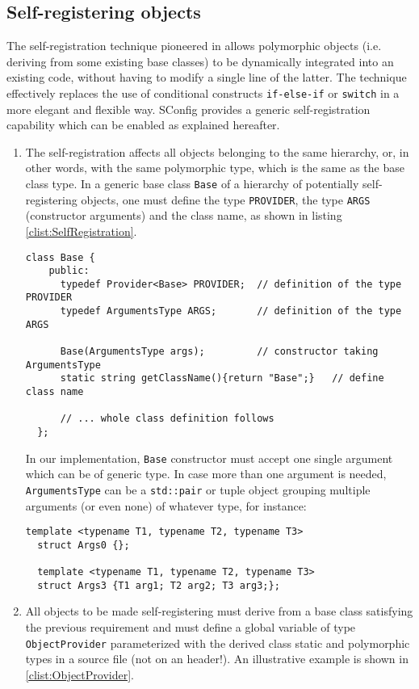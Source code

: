 \documentclass[11pt]{article}
\newcommand{\noi}{\noindent}
\begin{document}
\subsection{Self-registering objects}\label{ssec:self-registration}

The self-registration technique pioneered in \cite{Beveridge} allows 
polymorphic objects (i.e. deriving from some existing base classes) to be 
dynamically integrated into an existing code, without having to modify
a single line of the latter. The technique effectively replaces the
use of conditional constructs \texttt{if-else-if} or \texttt{switch}
in a more elegant and flexible way. SConfig provides a generic 
self-registration capability which can be enabled as explained hereafter.
\begin{enumerate}
\item
  The self-registration affects all objects belonging to the same 
  hierarchy, or, in other words, with the same polymorphic type, which
  is the same as the base class type. In a generic base class
  \texttt{Base} of a hierarchy of potentially self-registering objects, 
  one must define the type \texttt{PROVIDER}, the type \texttt{ARGS} 
  (constructor arguments) and the class name, as shown in listing \ref{clist:SelfRegistration}.  
\begin{lstlisting}[basicstyle={\small\sffamily},float=!htb,caption={How
    to enable Self-registration.}, label=clist:SelfRegistration]
  class Base {
    public:
      typedef Provider<Base> PROVIDER;  // definition of the type PROVIDER 
      typedef ArgumentsType ARGS;       // definition of the type ARGS      

      Base(ArgumentsType args);         // constructor taking ArgumentsType    
      static string getClassName(){return "Base";}   // define class name

      // ... whole class definition follows
  };
\end{lstlisting}
\noi
In our implementation, \texttt{Base} constructor must accept one single
argument which can be of generic type. In case more than one argument
is needed, \texttt{ArgumentsType} can be a \texttt{std::pair} or tuple
object grouping multiple arguments (or even none) of whatever type, 
for instance:
\begin{lstlisting}[basicstyle={\small\sffamily},float=!htb,caption={Examples
    of argument tuples.}, label=clist:ArgTuples]
  template <typename T1, typename T2, typename T3>
  struct Args0 {};

  template <typename T1, typename T2, typename T3>
  struct Args3 {T1 arg1; T2 arg2; T3 arg3;};
\end{lstlisting}
\noi
\item
  All objects to be made self-registering must derive from a
  base class satisfying the previous requirement and must define a
  global variable of type  \texttt{ObjectProvider} parameterized with 
  the derived class static and polymorphic types in a source file 
  (not on an header!). An illustrative example is shown in
  \ref{clist:ObjectProvider}.
  

\end{enumerate}
\end{document}
